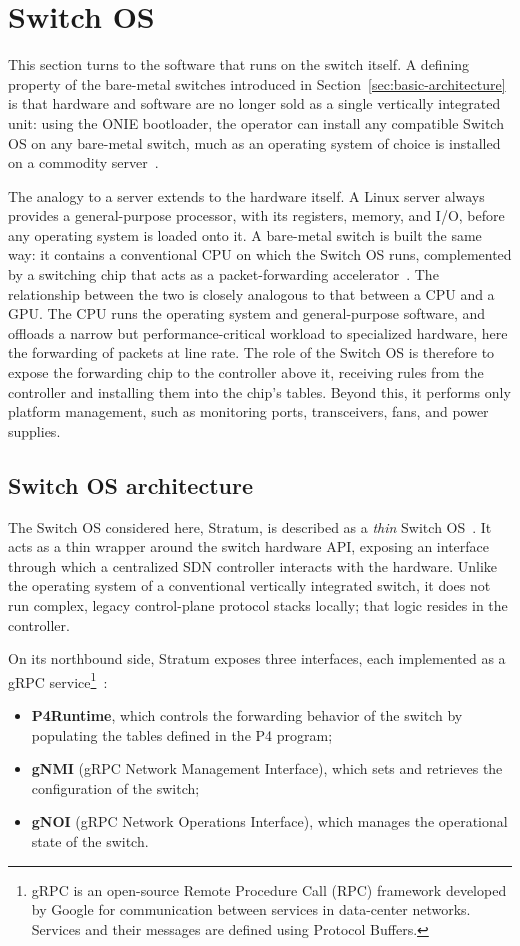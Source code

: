 \section{Switch OS}
This section turns to the software that runs on the switch itself. A defining property of the bare-metal switches introduced in Section~\ref{sec:basic-architecture} is that hardware and software are no longer sold as a single vertically integrated unit: using the ONIE bootloader, the operator can install any compatible Switch OS on any bare-metal switch, much as an operating system of choice is installed on a commodity server~\cite{onie, systemsapproach}.

The analogy to a server extends to the hardware itself. A Linux server always provides a general-purpose processor, with its registers, memory, and I/O, before any operating system is loaded onto it. A bare-metal switch is built the same way: it contains a conventional CPU on which the Switch OS runs, complemented by a switching chip that acts as a packet-forwarding accelerator~\cite{systemsapproach}. The relationship between the two is closely analogous to that between a CPU and a GPU. The CPU runs the operating system and general-purpose software, and offloads a narrow but performance-critical workload to specialized hardware, here the forwarding of packets at line rate. The role of the Switch OS is therefore to expose the forwarding chip to the controller above it, receiving rules from the controller and installing them into the chip's tables. Beyond this, it performs only platform management, such as monitoring ports, transceivers, fans, and power supplies.

\subsection{Switch OS architecture}
The Switch OS considered here, Stratum, is described as a \textit{thin} Switch OS~\cite{systemsapproach}. It acts as a thin wrapper around the switch hardware API, exposing an interface through which a centralized SDN controller interacts with the hardware. Unlike the operating system of a conventional vertically integrated switch, it does not run complex, legacy control-plane protocol stacks locally; that logic resides in the controller.

On its northbound side, Stratum exposes three interfaces, each implemented as a gRPC service\footnote{gRPC is an open-source Remote Procedure Call (RPC) framework developed by Google for communication between services in data-center networks. Services and their messages are defined using Protocol Buffers.}~\cite{systemsapproach}:
\begin{itemize}
    \item \textbf{P4Runtime}, which controls the forwarding behavior of the switch by populating the tables defined in the P4 program;
    \item \textbf{gNMI} (gRPC Network Management Interface), which sets and retrieves the configuration of the switch;
    \item \textbf{gNOI} (gRPC Network Operations Interface), which manages the operational state of the switch.
\end{itemize}

